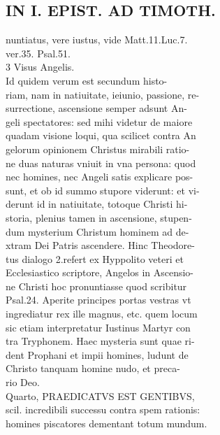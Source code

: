 \documentclass{article}
\begin{document}
\begin{pages}
\section*{IN I. EPIST. AD TIMOTH. \\
                }
nuntiatus, vere iustus, vide Matt.11.Luc.7. \\
                ver.35. Psal.51. \\
                3 Visus Angelis. \\
                Id quidem verum est secundum histo- \\
                riam, nam in natiuitate, ieiunio, passione, re- \\
                surrectione, ascensione semper adsunt An- \\
                geli spectatores: sed mihi videtur de maiore \\
                quadam visione loqui, qua scilicet contra An \\
                gelorum opinionem Christus mirabili ratio- \\
                ne duas naturas vniuit in vna persona: quod \\
                nec homines, nec Angeli satis explicare pos- \\
                sunt, et ob id summo stupore viderunt: et vi- \\
                derunt id in natiuitate, totoque Christi hi- \\
                storia, plenius tamen in ascensione, stupen- \\
                dum mysterium Christum hominem ad de- \\
                xtram Dei Patris ascendere. Hinc Theodore- \\
                tus dialogo 2.refert ex Hyppolito veteri et \\
                Ecclesiastico scriptore, Angelos in Ascensio- \\
                ne Christi hoc pronuntiasse quod scribitur \\
                Psal.24. Aperite principes portas vestras vt \\
                ingrediatur rex ille magnus, etc. quem locum \\
                sic etiam interpretatur Iustinus Martyr con \\
                tra Tryphonem. Haec mysteria sunt quae ri- \\
                dent Prophani et impii homines, ludunt de \\
                Christo tanquam homine nudo, et preca- \\
                rio Deo. \\
                Quarto, PRAEDICATVS EST GENTIBVS, \\
                scil. incredibili successu contra spem rationis: \\
                homines piscatores dementant totum mundum. \\
                

\end{pages}
\end{document}
